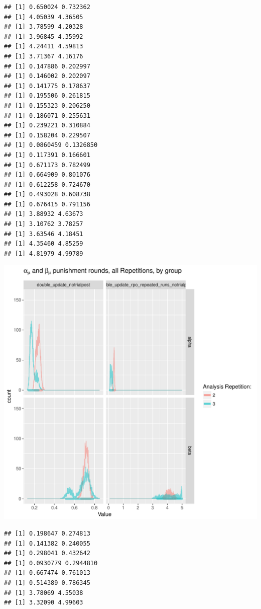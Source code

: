 \documentclass{article}\usepackage[]{graphicx}\usepackage[]{color}
\makeatletter
\def\maxwidth{ %
  \ifdim\Gin@nat@width>\linewidth
    \linewidth
  \else
    \Gin@nat@width
  \fi
}
\newenvironment{kframe}{%
 \def\at@end@of@kframe{}%
 \ifinner\ifhmode%
  \def\at@end@of@kframe{\end{minipage}}%
  \begin{minipage}{\columnwidth}%
 \fi\fi%
 \def\FrameCommand##1{\hskip\@totalleftmargin \hskip-\fboxsep
 \colorbox{shadecolor}{##1}\hskip-\fboxsep
     \hskip-\linewidth \hskip-\@totalleftmargin \hskip\columnwidth}%
 \MakeFramed {\advance\hsize-\width
   \@totalleftmargin\z@ \linewidth\hsize
   \@setminipage}}%
 {\par\unskip\endMakeFramed%
 \at@end@of@kframe}
\newenvironment{knitrout}{}{} %
\makeatother
\begin{document}
\begin{knitrout}
\begin{kframe}
\begin{verbatim}
## [1] 0.650024 0.732362
## [1] 4.05039 4.36505
## [1] 3.78599 4.20328
## [1] 3.96845 4.35992
## [1] 4.24411 4.59813
## [1] 3.71367 4.16176
## [1] 0.147886 0.202997
## [1] 0.146002 0.202097
## [1] 0.141775 0.178637
## [1] 0.195506 0.261815
## [1] 0.155323 0.206250
## [1] 0.186071 0.255631
## [1] 0.239221 0.310884
## [1] 0.158204 0.229507
## [1] 0.0860459 0.1326850
## [1] 0.117391 0.166601
## [1] 0.671173 0.782499
## [1] 0.664909 0.801076
## [1] 0.612258 0.724670
## [1] 0.493028 0.608738
## [1] 0.676415 0.791156
## [1] 3.88932 4.63673
## [1] 3.10762 3.78257
## [1] 3.63546 4.18451
## [1] 4.35460 4.85259
## [1] 4.81979 4.99789
\end{verbatim}
\end{kframe}
\includegraphics[width=\maxwidth]{figure/unnamed-chunk-6-2} 
\begin{kframe}\begin{verbatim}
## [1] 0.198647 0.274813
## [1] 0.141382 0.240055
## [1] 0.298041 0.432642
## [1] 0.0930779 0.2944810
## [1] 0.667474 0.761013
## [1] 0.514389 0.786345
## [1] 3.78069 4.55038
## [1] 3.32090 4.99603
\end{verbatim}
\end{kframe}

\end{knitrout}
\end{document}
